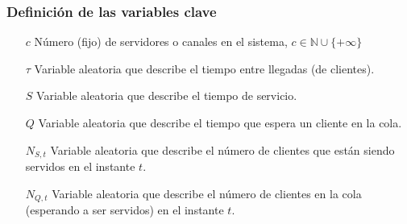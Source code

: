 \documentclass[8pt]{beamer}
\begin{document}
  \begin{frame}\frametitle{Definición de las variables clave}
    \begin{itemize}
    \item [$c$]
      Número (fijo) de servidores o canales en el sistema, $c\in \mathbb{N} \cup \{+\infty\}$
    \item [$\tau$]
      Variable aleatoria que describe el tiempo entre llegadas (de clientes).
    \item [$S$]
      Variable aleatoria que describe el tiempo de servicio.
    \item [$Q$]
      Variable aleatoria que describe el tiempo que espera un cliente en la cola.
    \item [$N_{S,t}$]
      Variable aleatoria que describe el número de clientes que están siendo servidos en el instante $t$.
    \item [$N_{Q,t}$]
      Variable aleatoria que describe el número de clientes en la cola (esperando a ser servidos) en el instante $t$.
    \end{itemize}
  \end{frame}
\end{document}
